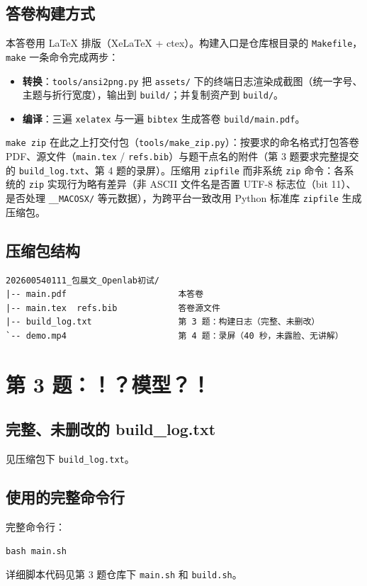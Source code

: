 \documentclass[a4paper, 12pt, linespread=1.35]{ctexart}   %
\newcommand{\keepwithnext}{\par\nobreak}
\begin{document}
\subsection{答卷构建方式}
本答卷用 \LaTeX{} 排版（XeLaTeX + ctex）。构建入口是仓库根目录的 \texttt{Makefile}，\texttt{make} 一条命令完成两步：
\begin{itemize}
  \item \textbf{转换}：\texttt{tools/ansi2png.py} 把 \texttt{assets/} 下的终端日志渲染成截图（统一字号、主题与折行宽度），输出到 \texttt{build/}；并复制资产到 \texttt{build/}。
  \item \textbf{编译}：三遍 \texttt{xelatex} 与一遍 \texttt{bibtex} 生成答卷 \texttt{build/main.pdf}。
\end{itemize}
\texttt{make zip} 在此之上打交付包（\texttt{tools/make\_zip.py}）：按要求的命名格式打包答卷 PDF、源文件（\texttt{main.tex} / \texttt{refs.bib}）与题干点名的附件（第 3 题要求完整提交的 \texttt{build\_log.txt}、第 4 题的录屏）。压缩用 \texttt{zipfile} 而非系统 \texttt{zip} 命令：各系统的 \texttt{zip} 实现行为略有差异（非 ASCII 文件名是否置 UTF-8 标志位（bit 11）、是否处理 \texttt{\_\_MACOSX/} 等元数据），为跨平台一致改用 Python 标准库 \texttt{zipfile} 生成压缩包。
\subsection{压缩包结构}
\begin{lstlisting}
202600540111_包晨文_Openlab初试/
|-- main.pdf                      本答卷
|-- main.tex  refs.bib            答卷源文件
|-- build_log.txt                 第 3 题：构建日志（完整、未删改）
`-- demo.mp4                      第 4 题：录屏（40 秒，未露脸、无讲解）
\end{lstlisting}

\section{第 3 题：！？模型？！}
\subsection{完整、未删改的 build\_log.txt}
见压缩包下 \texttt{build\_log.txt}。
\subsection{使用的完整命令行}
完整命令行：\keepwithnext
\begin{lstlisting}
bash main.sh
\end{lstlisting}
详细脚本代码见第 3 题仓库下 \texttt{main.sh} 和 \texttt{build.sh}。
\end{document}
